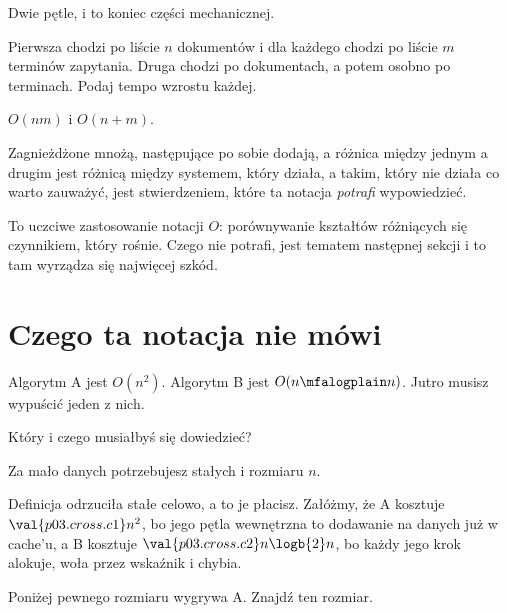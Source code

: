 \begin{fr}
Dwie pętle, i to koniec części mechanicznej.

Pierwsza chodzi po liście $n$ dokumentów i dla każdego chodzi po liście $m$
terminów zapytania. Druga chodzi po dokumentach, a potem osobno po terminach.
Podaj tempo wzrostu każdej.
\nextframe
\end{fr}

\begin{fr}
\begin{ansblock}
$O(nm)$ i $O(n + m)$.
\end{ansblock}

Zagnieżdżone mnożą, następujące po sobie dodają, a różnica między jednym a
drugim jest różnicą między systemem, który działa, a takim, który nie działa
\dash{} co warto zauważyć, jest stwierdzeniem, które ta notacja \emph{potrafi}
wypowiedzieć.

To uczciwe zastosowanie notacji $O$: porównywanie kształtów różniących się
czynnikiem, który rośnie. Czego nie potrafi, jest tematem następnej sekcji i
to tam wyrządza się najwięcej szkód.
\end{fr}

\section{Czego ta notacja nie mówi}
\label{sec:P03-not}

\begin{fr}
Algorytm A jest $O(n^{2})$. Algorytm B jest $O(n \mfalogplain n)$. Jutro musisz
wypuścić jeden z nich.

Który i czego musiałbyś się dowiedzieć?
\nextframe
\end{fr}

\begin{fr}
\begin{ansblock}
Za mało danych \dash{} potrzebujesz stałych i rozmiaru $n$.
\end{ansblock}

Definicja odrzuciła stałe celowo, a to je płacisz. Załóżmy, że A kosztuje
$\val{p03.cross.c1} n^{2}$, bo jego pętla wewnętrzna to dodawanie na danych już
w cache'u, a B kosztuje $\val{p03.cross.c2} n\logb{2} n$, bo każdy jego krok
alokuje, woła przez wskaźnik i chybia.

Poniżej pewnego rozmiaru wygrywa A. Znajdź ten rozmiar.
\nextframe
\end{fr}

